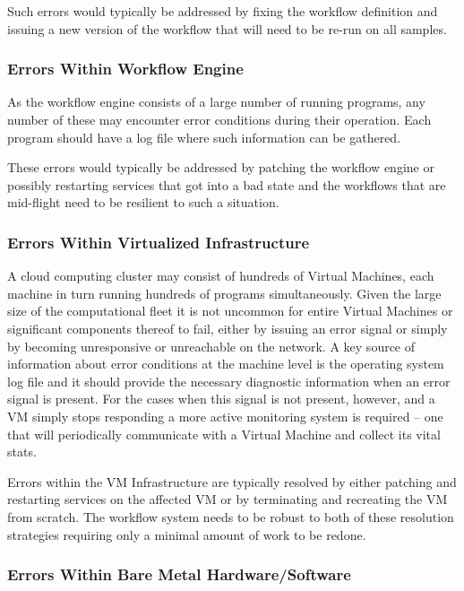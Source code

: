 Such errors would typically be addressed by fixing the workflow definition and issuing a new version of the workflow that will need to be re-run on all samples.

\subsubsection {Errors Within Workflow Engine}

As the workflow engine consists of a large number of running programs, any number of these may encounter error conditions during their operation. Each program should have a log file where such information can be gathered.

These errors would typically be addressed by patching the workflow engine or possibly restarting services that got into a bad state and the workflows that are mid-flight need to be resilient to such a situation.

\subsubsection {Errors Within Virtualized Infrastructure}

A cloud computing cluster may consist of hundreds of Virtual Machines, each machine in turn running hundreds of programs simultaneously. Given the large size of the computational fleet it is not uncommon for entire Virtual Machines or significant components thereof to fail, either by issuing an error signal or simply by becoming unresponsive or unreachable on the network. A key source of information about error conditions at the machine level is the operating system log file and it should provide the necessary diagnostic information when an error signal is present. For the cases when this signal is not present, however, and a VM simply stops responding a more active monitoring system is required -- one that will periodically communicate with a Virtual Machine and collect its vital stats.

Errors within the VM Infrastructure are typically resolved by either patching and restarting services on the affected VM or by terminating and recreating the VM from scratch. The workflow system needs to be robust to both of these resolution strategies requiring only a minimal amount of work to be redone.

\subsubsection {Errors Within Bare Metal Hardware/Software}

